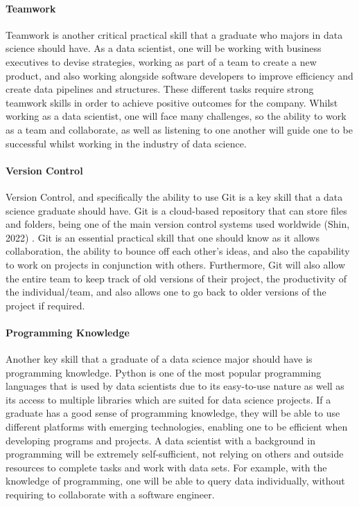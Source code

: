 \documentclass[a4paper, 11pt]{report}
\begin{document}
	\paragraph{Teamwork} Teamwork is another critical practical skill that a graduate who majors in data science should have. As a data scientist, one will be working with business executives to devise strategies, working as part of a team to create a new product, and also working alongside software developers to improve efficiency and create data pipelines and structures. These different tasks require strong teamwork skills in order to achieve positive outcomes for the company. Whilst working as a data scientist, one will face many challenges, so the ability to work as a team and collaborate, as well as listening to one another will guide one to be successful whilst working in the industry of data science.

	\paragraph{Version Control} Version Control, and specifically the ability to use Git is a key skill that a data science graduate should have. Git is a cloud-based repository that can store files and folders, being one of the main version control systems used worldwide (Shin, 2022)
	. Git is an essential practical skill that one should know as it allows collaboration, the ability to bounce off each other’s ideas, and also the capability to work on projects in conjunction with others. Furthermore, Git will also allow the entire team to keep track of old versions of their project, the productivity of the individual/team, and also allows one to go back to older versions of the project if required.

	\paragraph{Programming Knowledge} Another key skill that a graduate of a data science major should have is programming knowledge. Python is one of the most popular programming languages that is used by data scientists due to its easy-to-use nature as well as its access to multiple libraries which are suited for data science projects. If a graduate has a good sense of programming knowledge, they will be able to use different platforms with emerging technologies, enabling one to be efficient when developing programs and projects. A data scientist with a background in programming will be extremely self-sufficient, not relying on others and outside resources to complete tasks and work with data sets. For example, with the knowledge of programming, one will be able to query data individually, without requiring to collaborate with a software engineer.
\end{document}
